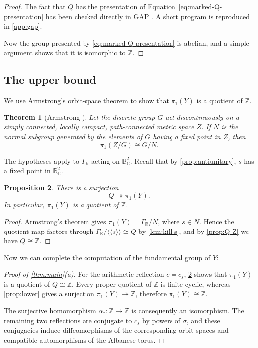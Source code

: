 \documentclass[11pt]{amsart}
\newtheorem{theorem}{Theorem}[section]
\newtheorem{proposition}[theorem]{Proposition}
\theoremstyle{definition}
\theoremstyle{remark}
\newcommand{\Z}{\mathbb Z}
\newcommand{\C}{\mathbb C}
\newcommand{\B}{\mathbb B^2_{\C}}
\newcommand{\normal}[1]{\mathopen{\langle\!\langle}#1\mathclose{\rangle\!\rangle}}
\begin{document}
\begin{proof}
The fact that $Q$ has the presentation of
Equation~\eqref{eq:marked-Q-presentation} has been checked directly in
\textsf{GAP} \cite{GAP4}.  A short program is reproduced in
\cref{app:gap}.

Now the group presented by \eqref{eq:marked-Q-presentation} is abelian, and
a simple argument shows that it is isomorphic to $\Z$.
\end{proof}

\subsection{The upper bound}
\label{sec:upper-bound}

We use Armstrong's orbit-space theorem to show that $\pi _1(Y)$ is
a quotient of $\Z$.

\begin{theorem}[Armstrong \cite{Armstrong}]\label{thm:Armstrong}
Let the discrete group $G$ act discontinuously on a simply connected, locally
compact, path-connected metric space $Z$.  If $N$ is the normal subgroup
generated by the elements of $G$ having a fixed point in $Z$, then
\[
 \pi_1(Z/G)\cong G/N.
\]
\end{theorem}

The hypotheses apply to $\Gamma_{\mathbb R}$ acting on $\B$.  Recall that by
\cref{prop:antiunitary}, $s$ has a fixed point in $\B$.

\begin{proposition}\label{prop:upper}
There is a surjection
\[
 Q\twoheadrightarrow\pi_1(Y).
\]
In particular, $\pi_1(Y)$ is a quotient of $\mathbb Z$.
\end{proposition}

\begin{proof}
Armstrong's theorem gives $\pi_1(Y)=\Gamma_{\mathbb R}/N$, where
$s\in N$.  Hence the quotient map factors through
$\Gamma_{\mathbb R}/\normal{s}\cong Q$ by \cref{lem:kill-s},
and by \cref{prop:Q-Z} we have 
$Q\cong\mathbb Z$.
\end{proof}

Now we can complete the computation of the fundamental group of $Y$:
\begin{proof}[Proof of \cref{thm:main}\textup{(a)}]
For the arithmetic reflection $c=c_s$, \cref{prop:upper} shows that
$\pi_1(Y)$ is a quotient of $Q\cong\mathbb Z$.  Every proper quotient of
$\mathbb Z$ is finite cyclic, whereas \cref{prop:lower} gives a surjection
$\pi_1(Y)\twoheadrightarrow\mathbb Z$, therefore
$ \pi_1(Y)\cong\Z$.

The surjective homomorphism $\bar\alpha_*\colon \Z\to\Z$ is consequently an
isomorphism.  The remaining two reflections are conjugate to $c_s$ by powers
of $\sigma$, and these conjugacies induce diffeomorphisms of the corresponding
orbit spaces and compatible automorphisms of the Albanese torus.  
\end{proof}
\end{document}
